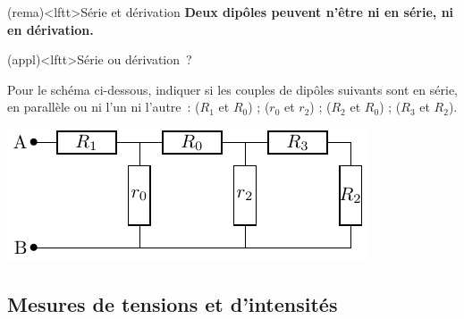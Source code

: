 \documentclass[../../main/main.tex]{subfiles}
\begin{document}
\begin{tcb}[label=rema:serdiv, halign=center](rema)<lftt>{Série et dérivation}
	\textbf{Deux dipôles peuvent n'être ni en série, ni en dérivation.}
\end{tcb}
\begin{tcb}[label=exer:serdiv](appl)<lftt>{Série ou dérivation~?}
	\begin{minipage}{0.65\linewidth}
		Pour le schéma ci-dessous, indiquer si les couples de dipôles suivants
		sont en série, en parallèle ou ni l'un ni l'autre~: ($R_1$ et $R_0$) ;
		($r_0$ et $r_2$) ; ($R_2$ et $R_0$) ; ($R_3$ et $R_2$).
	\end{minipage}
	\begin{minipage}{0.35\linewidth}
		\begin{center}
			\includegraphics[width=\linewidth]{exer_serdiv}
		\end{center}
	\end{minipage}
	\tcblower
\end{tcb}

\subsection{Mesures de tensions et d'intensités}
\end{document}
